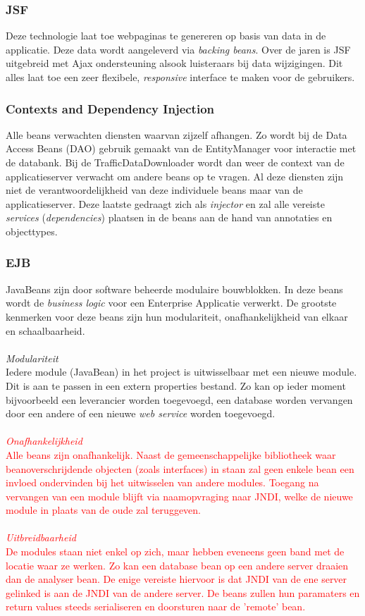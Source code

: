 \documentclass[ps,a4paper,oneside]{report}
\begin{document}
\subsubsection{JSF}
Deze technologie laat toe webpaginas te genereren op basis van data in de applicatie. Deze data wordt aangeleverd via \textit{backing beans}. Over de jaren is JSF uitgebreid met Ajax ondersteuning alsook luisteraars bij data wijzigingen. Dit alles laat toe een zeer flexibele, \textit{responsive} interface te maken voor de gebruikers.
\subsubsection{Contexts and Dependency Injection}
Alle beans verwachten diensten waarvan zijzelf afhangen. Zo wordt bij de Data Access Beans (DAO) gebruik gemaakt van de EntityManager voor interactie met de databank. Bij de TrafficDataDownloader wordt dan weer de context van de applicatieserver verwacht om andere beans op te vragen. Al deze diensten zijn niet de verantwoordelijkheid van deze individuele beans maar van de applicatieserver. Deze laatste gedraagt zich als \textit{injector} en zal alle vereiste \textit{services} (\textit{dependencies}) plaatsen in de beans aan de hand van annotaties en objecttypes.
\subsubsection{EJB}
JavaBeans zijn door software beheerde modulaire bouwblokken. In deze beans wordt de \textit{business logic} voor een Enterprise Applicatie verwerkt. De grootste kenmerken voor deze beans zijn hun modulariteit, onafhankelijkheid van elkaar en schaalbaarheid.\\\\
\textit{Modulariteit}\\
Iedere module (JavaBean) in het project is uitwisselbaar met een nieuwe module. Dit is aan te passen in een extern properties bestand. Zo kan op ieder moment bijvoorbeeld een leverancier worden toegevoegd, een database worden vervangen door een andere of een nieuwe \textit{web service} worden toegevoegd.\\\\
\textcolor{red}{\textit{Onafhankelijkheid}\\
Alle beans zijn onafhankelijk. Naast de gemeenschappelijke bibliotheek waar beanoverschrijdende objecten (zoals interfaces) in staan zal geen enkele bean een invloed ondervinden bij het uitwisselen van andere modules. Toegang na vervangen van een module blijft via naamopvraging naar JNDI, welke de nieuwe module in plaats van de oude zal teruggeven.\\\\
\textit{Uitbreidbaarheid}\\
De modules staan niet enkel op zich, maar hebben eveneens geen band met de locatie waar ze werken. Zo kan een database bean op een andere server draaien dan de analyser bean. De enige vereiste hiervoor is dat JNDI van de ene server gelinked is aan de JNDI van de andere server. De beans zullen hun paramaters en return values steeds serialiseren en doorsturen naar de 'remote' bean.
}
\end{document}
